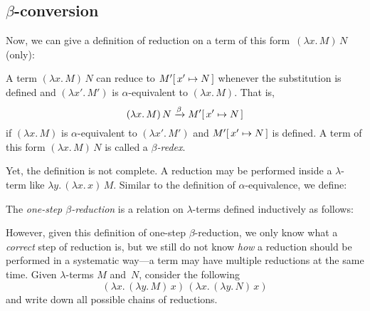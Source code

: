\subsection{$\beta$-conversion}
Now, we can give a definition of reduction on a term of this form~$(\lambda
x.\, M)\, N$ (only):
\begin{definition}
  A term $(\lambda x.\, M)\, N$ can reduce to $M'\subst{x'}{N}$ whenever the
  substitution is defined and $(\lambda x'.\, M')$ is $\alpha$-equivalent to
  $(\lambda x.\, M)$. 
  That is,
  \[
    (\lambda x.\, M)\, N \xrightarrow{\beta} M'\subst{x'}{N}
  \]
  if $(\lambda x.\, M)$ is $\alpha$-equivalent to $(\lambda x'.\, M')$ and
  $M'\subst{x'}{N}$ is defined.  A term of this form $(\lambda x.\, M)\, N$ is
  called a \emph{$\beta$-redex}.
\end{definition}
Yet, the definition is not complete. A reduction may be performed inside a
$\lambda$-term like $\lambda y.\, (\lambda x.\, x)\, M$. Similar to the
definition of $\alpha$-equivalence, we define:
\begin{definition}
  The \emph{one-step $\beta$-reduction} is a relation on $\lambda$-terms
  defined inductively as follows:
  \begin{multicols}{2}
    \begin{prooftree}
    \end{prooftree}
    \begin{prooftree}
    \end{prooftree}
    \begin{prooftree}
    \end{prooftree}
  \end{multicols}
\end{definition}
%
However, given this definition of one-step $\beta$-reduction, we only know what a
\emph{correct} step of reduction is, but we still do not know \emph{how} 
a reduction should be performed in a systematic way---a term may have multiple
reductions at the same time. Given $\lambda$-terms $M$ and~$N$, consider the following
\[
  (\lambda x.\, (\lambda y.\, M)\,x)\,
  (\lambda x.\, (\lambda y.\, N)\,x)
\]
and write down all possible chains of reductions.
